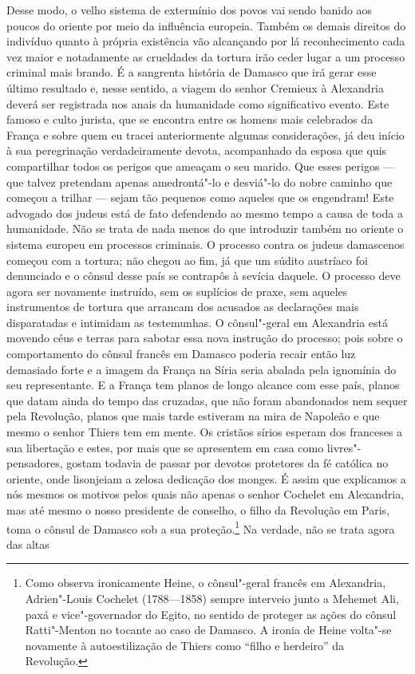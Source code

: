 Desse modo, o velho sistema de extermínio dos povos vai sendo banido aos
poucos do oriente por meio da influência europeia. Também os demais
direitos do indivíduo quanto à própria existência vão alcançando por lá
reconhecimento cada vez maior e notadamente as crueldades da tortura
irão ceder lugar a um processo criminal mais brando. É a sangrenta
história de Damasco que irá gerar esse último resultado e, nesse
sentido, a viagem do senhor Cremieux à Alexandria deverá ser registrada
nos anais da humanidade como significativo evento. Este famoso e culto
jurista, que se encontra entre os homens mais celebrados da França e
sobre quem eu tracei anteriormente algumas considerações, já deu início
à sua peregrinação verdadeiramente devota, acompanhado da esposa que
quis compartilhar todos os perigos que ameaçam o seu marido. Que esses
perigos --- que talvez pretendam apenas amedrontá"-lo e desviá"-lo do
nobre caminho que começou a trilhar --- sejam tão pequenos como aqueles
que os engendram! Este advogado dos judeus está de fato defendendo ao
mesmo tempo a causa de toda a humanidade. Não se trata de nada menos do
que introduzir também no oriente o sistema europeu em processos
criminais. O processo contra os judeus damascenos começou com a
tortura; não chegou ao fim, já que um súdito austríaco foi
denunciado e o cônsul desse país se contrapôs à sevícia daquele. O
processo deve agora ser novamente instruído, sem os suplícios de praxe,
sem aqueles instrumentos de tortura que arrancam dos acusados as
declarações mais disparatadas e intimidam as testemunhas. O
cônsul"-geral em Alexandria está movendo céus e terras para sabotar
essa nova instrução do processo; pois sobre o comportamento do cônsul
francês em Damasco poderia recair então luz demasiado forte e a imagem
da França na Síria seria abalada pela ignomínia do seu representante. E
a França tem planos de longo alcance com esse país, planos que datam
ainda do tempo das cruzadas, que não foram abandonados nem sequer pela
Revolução, planos que mais tarde estiveram na mira de Napoleão e que
mesmo o senhor Thiers tem em mente. Os cristãos sírios esperam dos
franceses a sua libertação e estes, por mais que se apresentem em casa
como livres"-pensadores, gostam todavia de passar por devotos
protetores da fé católica no oriente, onde lisonjeiam a zelosa
dedicação dos monges. É assim que explicamos a nós mesmos os motivos
pelos quais não apenas o senhor Cochelet em Alexandria, mas até mesmo o
nosso presidente de conselho, o filho da Revolução em Paris, toma o
cônsul de Damasco sob a sua proteção.\footnote{ Como observa
ironicamente Heine, o cônsul"-geral francês em Alexandria,
Adrien"-Louis Cochelet (1788---1858) sempre interveio junto a Mehemet
Ali, paxá e vice"-governador do Egito, no sentido de proteger as ações
do cônsul Ratti"-Menton no tocante ao caso de Damasco. A ironia de
Heine volta"-se novamente à autoestilização de Thiers como “filho e
herdeiro” da Revolução.} Na verdade, não se trata agora das altas
